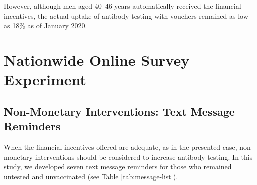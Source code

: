 \documentclass[
  11pt,
  a4paper
]{article}
\begin{document}
However, although men aged 40--46 years automatically received the financial incentives, the actual uptake of antibody testing with vouchers remained as low as 18\% as of January 2020.

\hypertarget{experiment}{%
\section{Nationwide Online Survey Experiment}\label{experiment}}

\hypertarget{intervention}{%
\subsection{Non-Monetary Interventions: Text Message Reminders}\label{intervention}}

When the financial incentives offered are adequate, as in the presented case, non-monetary interventions should be considered to increase antibody testing. In this study, we developed seven text message reminders for those who remained untested and unvaccinated (see Table \ref{tab:message-list}).
\end{document}
